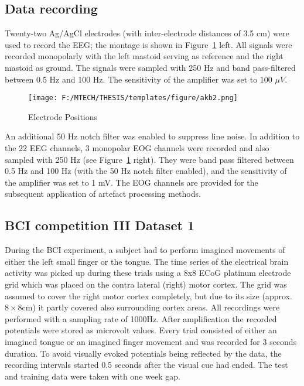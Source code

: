 \subsection{Data recording}
Twenty-two Ag/AgCl electrodes (with inter-electrode distances of 3.5 cm) were used to record the EEG; the montage is shown in Figure~\ref{akb2} left. All signals were recorded monopolarly with the left mastoid serving as reference and the right mastoid as ground. The signals were sampled with 250 Hz and band pass-filtered between 0.5 Hz and 100 Hz. The sensitivity of the amplifier was set to 100 $ \mu V $. 
\begin{figure}[hbtp]
\centering
\texttt{[image: F:/MTECH/THESIS/templates/figure/akb2.png]}
\caption{Electrode Positions}
\label{akb2}
\end{figure}

   An additional 50 Hz notch filter was enabled to suppress line noise. In addition to the 22 EEG channels, 3 monopolar EOG channels were recorded and also sampled with 250 Hz (see Figure~\ref{akb2} right). They were band pass filtered between 0.5 Hz and 100 Hz (with the 50 Hz notch filter enabled), and the sensitivity of the amplifier was set to 1 mV. The EOG channels are provided for the subsequent application of artefact processing methods.
\subsection{BCI competition III Dataset 1}
 During the BCI experiment, a subject had to perform imagined movements of either the left small finger or the tongue. The time series of the electrical brain activity was picked up during these trials using a 8x8 ECoG platinum electrode grid which was placed on the contra lateral (right) motor cortex. The grid was assumed to cover the right motor cortex completely, but due to its size (approx. $ 8\times 8 $cm) it partly covered also surrounding cortex areas. All recordings were performed with a sampling rate of 1000Hz. After amplification the recorded potentials were stored as microvolt values. Every trial consisted of either an imagined tongue or an imagined finger movement and was recorded for 3 seconds duration. To avoid visually evoked potentials being reflected by the data, the recording intervals started 0.5 seconds after the visual cue had ended. The test and training data were taken with one week gap.
